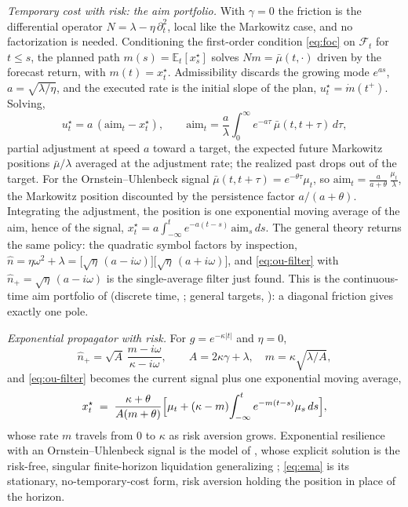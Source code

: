 \documentclass[11pt]{article}
\newcommand{\E}{\mathbb{E}}
\newcommand{\F}{\mathcal{F}}
\theoremstyle{plain}
\theoremstyle{definition}
\theoremstyle{remark}
\begin{document}
\emph{Temporary cost with risk: the aim portfolio.} With $\gamma=0$ the friction is the differential operator $N=\lambda-\eta\,\partial_t^2$, local like the Markowitz case, and no factorization is needed. Conditioning the first-order condition \eqref{eq:foc} on $\F_t$ for $t\le s$, the planned path $m(s)=\E_t[x^\star_s]$ solves $Nm=\bar\mu(t,\cdot)$ driven by the forecast return, with $m(t)=x^\star_t$. Admissibility discards the growing mode $e^{as}$, $a=\sqrt{\lambda/\eta}$, and the executed rate is the initial slope of the plan, $u^\star_t=\dot m(t^+)$. Solving,
\begin{equation}\label{eq:gp}
u^\star_t = a\,(\mathrm{aim}_t - x^\star_t), \qquad
\mathrm{aim}_t = \frac{a}{\lambda}\int_0^\infty e^{-a\tau}\,\bar\mu(t,t+\tau)\,d\tau,
\end{equation}
partial adjustment at speed $a$ toward a target, the expected future Markowitz positions $\bar\mu/\lambda$ averaged at the adjustment rate; the realized past drops out of the target. For the Ornstein--Uhlenbeck signal $\bar\mu(t,t+\tau)=e^{-\theta\tau}\mu_t$, so $\mathrm{aim}_t=\frac{a}{a+\theta}\,\frac{\mu_t}{\lambda}$, the Markowitz position discounted by the persistence factor $a/(a+\theta)$. Integrating the adjustment, the position is one exponential moving average of the aim, hence of the signal, $x^\star_t=a\int_{-\infty}^t e^{-a(t-s)}\,\mathrm{aim}_s\,ds$. The general theory returns the same policy: the quadratic symbol factors by inspection, $\hat n=\eta\omega^2+\lambda=\bigl[\sqrt\eta\,(a-i\omega)\bigr]\bigl[\sqrt\eta\,(a+i\omega)\bigr]$, and \eqref{eq:ou-filter} with $\hat n_+=\sqrt\eta\,(a-i\omega)$ is the single-average filter just found. This is the continuous-time aim portfolio of \citet{GarleanuPedersen2016} (discrete time, \citet{GarleanuPedersen2013}; general targets, \citet{BankSonerVoss2017}): a diagonal friction gives exactly one pole.

\emph{Exponential propagator with risk.} For $g=e^{-\kappa|t|}$ and $\eta=0$,
\begin{equation}\label{eq:exp-factor}
\hat n_+ = \sqrt A\,\frac{m-i\omega}{\kappa-i\omega}, \qquad A=2\kappa\gamma+\lambda,\quad m=\kappa\sqrt{\lambda/A},
\end{equation}
and \eqref{eq:ou-filter} becomes the current signal plus one exponential moving average,
\begin{equation}\label{eq:ema}
x^\star_t \;=\; \frac{\kappa+\theta}{A(m+\theta)}\Bigl[\mu_t + (\kappa-m)\!\int_{-\infty}^t e^{-m(t-s)}\mu_s\,ds\Bigr],
\end{equation}
whose rate $m$ travels from $0$ to $\kappa$ as risk aversion grows. Exponential resilience with an Ornstein--Uhlenbeck signal is the model of \citet{LehalleNeuman2019}, whose explicit solution is the risk-free, singular finite-horizon liquidation generalizing \citet{ObizhaevaWang2013}; \eqref{eq:ema} is its stationary, no-temporary-cost form, risk aversion holding the position in place of the horizon.
\end{document}
